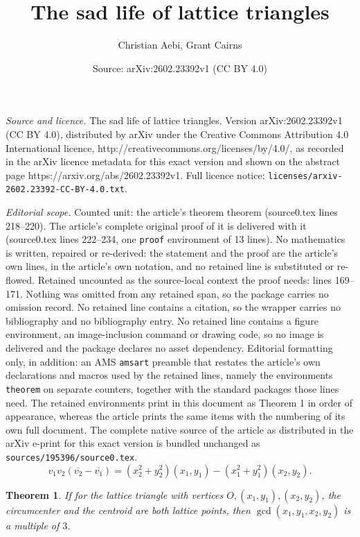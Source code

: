\documentclass[10pt,a4paper]{amsart}
\title{The sad life of lattice triangles}
\author{Christian Aebi, Grant Cairns}
\date{Source: arXiv:2602.23392v1 (CC BY 4.0)}
\newtheorem{theorem}{Theorem}
\begin{document}
\maketitle

\noindent\emph{Source and licence.} The sad life of lattice triangles. Version arXiv:2602.23392v1 (CC BY 4.0), distributed by arXiv under the Creative Commons Attribution 4.0 International licence, http://creativecommons.org/licenses/by/4.0/, as recorded in the arXiv licence metadata for this exact version and shown on the abstract page https://arxiv.org/abs/2602.23392v1. Full licence notice: \texttt{licenses/arxiv-2602.23392-CC-BY-4.0.txt}.\par\smallskip

\noindent\textit{Editorial scope.} Counted unit: the article's theorem theorem (source0.tex lines 218--220). The article's complete original proof of it is delivered with it (source0.tex lines 222--234, one \texttt{proof} environment of 13 lines). No mathematics is written, repaired or re-derived: the statement and the proof are the article's own lines, in the article's own notation, and no retained line is substituted or re-flowed.  Retained uncounted as the source-local context the proof needs: lines 169--171.  Nothing was omitted from any retained span, so the package carries no omission record.  No retained line contains a citation, so the wrapper carries no bibliography and no bibliography entry.  No retained line contains a figure environment, an image-inclusion command or drawing code, so no image is delivered and the package declares no asset dependency.  Editorial formatting only, in addition: an AMS \texttt{amsart} preamble that restates the article's own declarations and macros used by the retained lines, namely the environments \texttt{theorem} on separate counters, together with the standard packages those lines need.  The retained environments print in this document as Theorem 1 in order of appearance, whereas the article prints the same items with the numbering of its own full document.  The complete native source of the article as distributed in the arXiv e-print for this exact version is bundled unchanged as \texttt{sources/195396/source0.tex}.
\begin{equation}\label{E:Omeganum}
v_1v_2(\overline{v_2}-\overline{v_1})=(x_2^2+y_2^2)(x_1,y_1) - (x_1^2+y_1^2)(x_2,y_2).
\end{equation}

\begin{theorem}
If for the lattice triangle with vertices $O,(x_1,y_1),(x_2,y_2)$, the circumcenter  and the centroid are both lattice points, then $\gcd(x_1,y_1,x_2,y_2)$ is a multiple of $3$.
\end{theorem}
\end{document}
